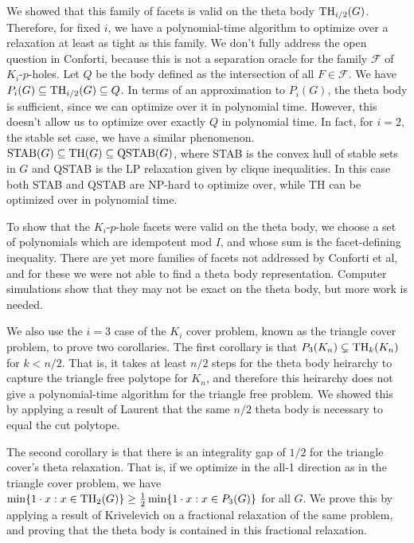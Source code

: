 We showed that this family of facets is valid on the theta body $\textup{TH}_{i/2}(G)$. 
Therefore, for fixed $i$, we have a polynomial-time algorithm to optimize over a relaxation at least as tight as this family. 
We don't fully address the open question in Conforti, because this is not a separation oracle for the family $\mathcal{F}$ of $K_i$-$p$-holes. 
Let $Q$ be the body defined as the intersection of all $F \in \mathcal{F}$.
We have $P_i(G) \subseteq \textup{TH}_{i/2}(G) \subseteq Q$.
In terms of an approximation to $P_i(G)$, the theta body is sufficient, since we can optimize over it in polynomial time. 
However, this doesn't allow us to optimize over exactly $Q$ in polynomial time.
In fact, for $i=2$, the stable set case, we have a similar phenomenon.
$\textup{STAB}(G) \subseteq \textup{TH}(G) \subseteq \textup{QSTAB}(G)$, where STAB is the convex hull of stable sets in $G$ and QSTAB is the LP relaxation given by clique inequalities.
In this case both STAB and QSTAB are NP-hard to optimize over, while TH can be optimized over in polynomial time.

To show that the $K_i$-$p$-hole facets were valid on the theta body, we choose a set of 
polynomials which are idempotent mod $I$, and whose sum is the facet-defining
inequality. There are yet more families of facets not addressed by Conforti 
et al, and for these we were not able to find a theta body representation. 
Computer simulations show that they may not be exact on the theta body, but
more work is needed.

We also use the $i=3$ case of the $K_i$ cover problem, known as the triangle
cover problem, to prove two corollaries. 
The first corollary is that $P_3(K_n) \subsetneq \textup{TH}_{k}(K_n)$ for $k < n/2$.
That is, it takes at least $n/2$ steps for the theta body heirarchy to capture the triangle free polytope for $K_n$, and therefore this heirarchy does not give a polynomial-time algorithm for the triangle free problem.
We showed this by applying a result of Laurent that the same $n/2$ theta body is necessary to equal the cut polytope.

The second corollary is that there is an integrality gap of $1/2$ for the triangle cover's theta relaxation. 
That is, if we optimize in the all-1 direction as in the triangle cover problem, we have $\min \{1 \cdot x: x \in \textup{TH}_2(G) \} \ge \frac{1}{2} \min \{1 \cdot x: x \in P_3(G)\}$ for all $G$. 
We prove this by applying a result of Krivelevich on a fractional relaxation of the same problem, and proving that the theta body is contained in this fractional relaxation.

